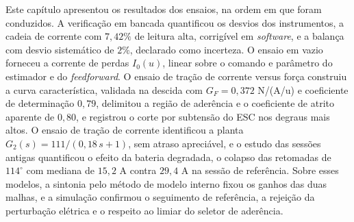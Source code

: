 Este capítulo apresentou os resultados dos ensaios, na ordem em que foram conduzidos. A
verificação em bancada quantificou os desvios dos instrumentos, a cadeia de corrente com
$7{,}42\%$ de leitura alta, corrigível em \emph{software}, e a balança com desvio
sistemático de $2\%$, declarado como incerteza. O ensaio em vazio forneceu a corrente de
perdas $I_0(u)$, linear sobre o comando e parâmetro do estimador e do \emph{feedforward}.
O ensaio de tração de corrente versus força construiu a curva característica, validada na
descida com $G_F = 0{,}372$ N/(A/u) e coeficiente de determinação $0{,}79$, delimitou a
região de aderência e o coeficiente de atrito aparente de $0{,}80$, e registrou o corte por
subtensão do ESC nos degraus mais altos. O ensaio de tração de corrente identificou a
planta $G_2(s) = 111/(0{,}18\,s + 1)$, sem atraso apreciável, e o estudo das sessões
antigas quantificou o efeito da bateria degradada, o colapso das retomadas de $114^\circ$
com mediana de $15{,}2$ A contra $29{,}4$ A na sessão de referência. Sobre esses modelos, a
sintonia pelo método de modelo interno fixou os ganhos das duas malhas, e a simulação
confirmou o seguimento de referência, a rejeição da perturbação elétrica e o respeito ao
limiar do seletor de aderência.
